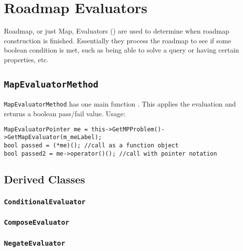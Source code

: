 \chapter{Roadmap Evaluators}

Roadmap, or just Map, Evaluators (\me) are used to determine when roadmap
construction is finished. Essentially they process the roadmap to see if some
boolean condition is met, such as being able to solve a query or having certain
properties, etc.

\section{\texttt{MapEvaluatorMethod}}

\texttt{MapEvaluatorMethod} has one main function . This
applies the evaluation and returns a boolean pass/fail value. Usage:
\begin{lstlisting}
MapEvaluatorPointer me = this->GetMPProblem()->GetMapEvaluator(m_meLabel);
bool passed = (*me)(); //call as a function object
bool passed2 = me->operator()(); //call with pointer notation
\end{lstlisting}

\section{Derived Classes}

\subsection{\texttt{ConditionalEvaluator}}

\subsection{\texttt{ComposeEvaluator}}

\subsection{\texttt{NegateEvaluator}}

